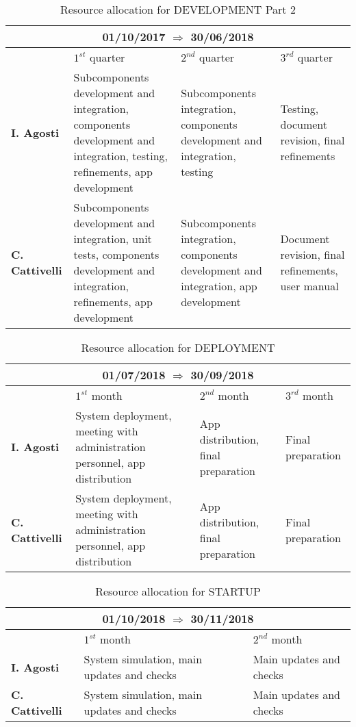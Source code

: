 \begin{table}[H]
	\centering
	\begin{tabular}{| m{2.6cm} | m{3.2cm} | m{3.2cm} | m{3.2cm} | }
		\hline
		\multicolumn{4}{|c|}{ \textbf{01/10/2017 $\Rightarrow$ 30/06/2018 } } \\
		\hline
		\hline
		\textbf & \(1^{st}\) quarter & \(2^{nd}\) quarter & \(3^{rd}\) quarter \\
		\hline
		\textbf{I. Agosti} & Subcomponents development and integration, components development and integration, testing, refinements, app development & Subcomponents integration, components development and integration, testing & Testing, document revision, final refinements\\
		\hline
		\textbf{C. Cattivelli} & Subcomponents development and integration, unit tests, components development and integration, refinements, app development & Subcomponents integration, components development and integration, app development & Document revision, final refinements, user manual\\ 
		\hline
	\end{tabular}
	\caption{Resource allocation for DEVELOPMENT Part 2}
\end{table}

\begin{table}[H]
	\centering
	\begin{tabular}{| m{2.6cm} | m{3.2cm} | m{3.2cm} | m{3.2cm} | }
		\hline
		\multicolumn{4}{|c|}{ \textbf{01/07/2018 $\Rightarrow$ 30/09/2018 } } \\
		\hline
		\hline
		\textbf & \(1^{st}\) month & \(2^{nd}\) month & \(3^{rd}\) month \\
		\hline
		\textbf{I. Agosti} & System deployment, meeting with administration personnel, app distribution & App distribution, final preparation & Final preparation \\
		\hline
		\textbf{C. Cattivelli} & System deployment, meeting with administration personnel, app distribution & App distribution, final preparation & Final preparation\\ 
		\hline
	\end{tabular}
	\caption{Resource allocation for DEPLOYMENT}
\end{table}

\begin{table}[H]
	\centering
	\begin{tabular}{| m{2.6cm} | m{5cm} | m{5cm} | }
		\hline
		\multicolumn{3}{|c|}{ \textbf{01/10/2018 $\Rightarrow$ 30/11/2018 } } \\
		\hline
		\hline
		\textbf & \(1^{st}\) month & \(2^{nd}\) month \\
		\hline
		\textbf{I. Agosti} & System simulation, main updates and checks & Main updates and checks\\
		\hline
		\textbf{C. Cattivelli} & System simulation, main updates and checks & Main updates and checks \\ 
		\hline
	\end{tabular}
	\caption{Resource allocation for STARTUP}
\end{table}